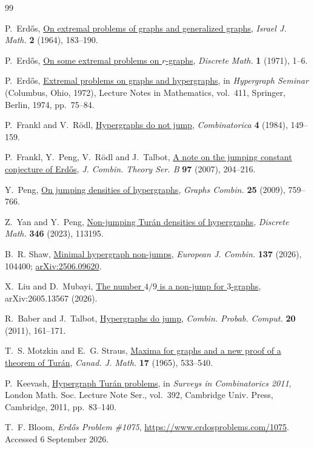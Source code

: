 \documentclass[11pt]{article}
\numberwithin{equation}{section}
\begin{document}
\begin{thebibliography}{99}

P.~Erd\H{o}s,
\href{https://users.renyi.hu/~p_erdos/1964-13.pdf}
{On extremal problems of graphs and generalized graphs},
\emph{Israel J. Math.} \textbf{2} (1964), 183--190.

P.~Erd\H{o}s,
\href{https://doi.org/10.1016/0012-365X(71)90002-1}
{On some extremal problems on \(r\)-graphs},
\emph{Discrete Math.} \textbf{1} (1971), 1--6.

P.~Erd\H{o}s,
\href{https://users.renyi.hu/~p_erdos/1974-10.pdf}
{Extremal problems on graphs and hypergraphs},
in \emph{Hypergraph Seminar} (Columbus, Ohio, 1972),
Lecture Notes in Mathematics, vol.~411,
Springer, Berlin, 1974, pp.~75--84.

P.~Frankl and V.~R\"odl,
\href{https://doi.org/10.1007/BF02579215}
{Hypergraphs do not jump},
\emph{Combinatorica} \textbf{4} (1984), 149--159.

P.~Frankl, Y.~Peng, V.~R\"odl and J.~Talbot,
\href{https://doi.org/10.1016/j.jctb.2006.05.004}
{A note on the jumping constant conjecture of Erd\H{o}s},
\emph{J. Combin. Theory Ser. B} \textbf{97} (2007), 204--216.

Y.~Peng,
\href{https://doi.org/10.1007/s00373-010-0874-4}
{On jumping densities of hypergraphs},
\emph{Graphs Combin.} \textbf{25} (2009), 759--766.

Z.~Yan and Y.~Peng,
\href{https://doi.org/10.1016/j.disc.2022.113195}
{Non-jumping Tur\'an densities of hypergraphs},
\emph{Discrete Math.} \textbf{346} (2023), 113195.

B.~R. Shaw,
\href{https://doi.org/10.1016/j.ejc.2026.104400}
{Minimal hypergraph non-jumps},
\emph{European J. Combin.} \textbf{137} (2026), 104400;
\href{https://arxiv.org/abs/2506.09620}{arXiv:2506.09620}.

X.~Liu and D.~Mubayi,
\href{https://arxiv.org/abs/2605.13567}
{The number \(4/9\) is a non-jump for \(3\)-graphs},
arXiv:2605.13567 (2026).

R.~Baber and J.~Talbot,
\href{https://doi.org/10.1017/S0963548310000222}
{Hypergraphs do jump},
\emph{Combin. Probab. Comput.} \textbf{20} (2011), 161--171.

T.~S. Motzkin and E.~G. Straus,
\href{https://doi.org/10.4153/CJM-1965-053-6}
{Maxima for graphs and a new proof of a theorem of Tur\'an},
\emph{Canad. J. Math.} \textbf{17} (1965), 533--540.

P.~Keevash,
\href{https://doi.org/10.1017/CBO9781139004114.004}
{Hypergraph Tur\'an problems},
in \emph{Surveys in Combinatorics 2011},
London Math. Soc. Lecture Note Ser., vol.~392,
Cambridge Univ. Press, Cambridge, 2011, pp.~83--140.

T.~F. Bloom,
\emph{Erd\H{o}s Problem \#1075},
\url{https://www.erdosproblems.com/1075}.
Accessed 6 September 2026.

\end{thebibliography}
\end{document}
